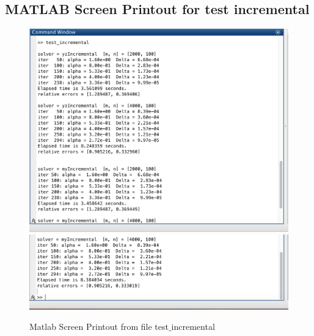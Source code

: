 \clearpage
\subsection*{MATLAB Screen Printout for test incremental}
\begin{figure}[H]
\centering
\includegraphics[width=18cm]{f_5}
\includegraphics[width=18cm]{f_6}
\caption{Matlab Screen Printout from file test$\_$incremental}
\end{figure}
